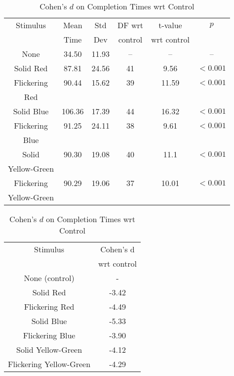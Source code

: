 \documentclass{llncs}
\begin{document}
\begin{table}[ht!]
\parbox{.45\textwidth}{
\scriptsize
\centering 
\caption{\scriptsize Avg times (sec) for successful pairing.}
\label{tab:times}
{\setlength{\extrarowheight}{10pt}
\begin{tabular}{||c|c|c|c|c|c||}
\hline \cline{1-6}
{\scriptsize Stimulus} & {\scriptsize Mean}  & {\scriptsize Std} & DF wrt & t-value  &   $p$
\vspace*{-0.3cm} \\
 & Time 	& Dev &  control & wrt control & 
\\ \hline \cline{1-6}
None & 34.50 & 11.93 & -- & -- & -- 
\\ \hline
Solid Red &	        87.81 & 	24.56 & 	41 & 9.56 &  $<0.001$
\\ \hline
Flickering &	90.44 &	15.62 & 39 & 11.59 & $<0.001$
\vspace*{-0.3cm}\\
Red& & & & & 	
\\ \hline
Solid Blue &	106.36 &	17.39 & 44 & 16.32 & $<0.001$ 
\\ \hline
Flickering &           	91.25 & 24.11 & 38 & 9.61 & $<0.001$
\vspace*{-0.3cm}\\
Blue& & & & &
\\ \hline
Solid &           90.30 & 19.08 & 40 & 11.1 & $<0.001$
\vspace*{-0.3cm}\\
Yellow-Green& & & & & 
\\ \hline
Flickering  &           	90.29 & 19.06 & 37 & 10.01 & $<0.001$
\vspace*{-0.3cm}\\
Yellow-Green& & & & &  
\\ \hline \cline{1-6}
\end{tabular}}
}
\hfill
\parbox{.45\textwidth}{
%
\small
\centering 
\caption{\scriptsize Cohen's $d$ on Completion Times wrt Control}
\label{tab:Cohen}
{\setlength{\extrarowheight}{10pt}
\begin{tabular}{||c|c||}
\hline \cline{1-2}
Stimulus &  Cohen's d  
\vspace*{-0.3cm} \\
	&	wrt control 
\\ \hline \cline{1-2}
None (control)	& -
\\  \hline
Solid Red &	        -3.42
\\ \hline
Flickering Red &	-4.49
\\ \hline
Solid Blue &	-5.33 
\\ \hline
Flickering Blue &  -3.90
\\ \hline
Solid Yellow-Green &  -4.12 
\\ \hline
Flickering Yellow-Green &   -4.29 	
\\ \hline \cline{1-2}
\end{tabular}}
}
\end{table}
\end{document}
